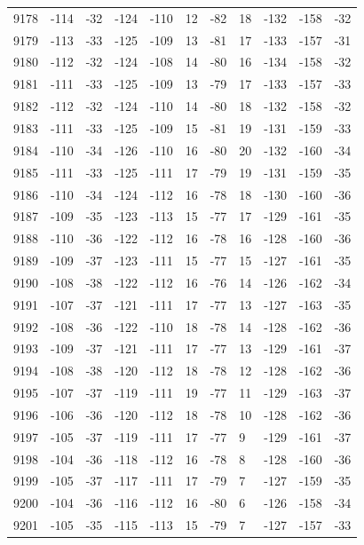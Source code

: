 \begin{table}[H]
\begin{tabular}{lllllllllll}
9178 & -114 & -32 & -124 & -110 & 12 & -82 & 18 & -132 & -158 & -32 \\
9179 & -113 & -33 & -125 & -109 & 13 & -81 & 17 & -133 & -157 & -31 \\
9180 & -112 & -32 & -124 & -108 & 14 & -80 & 16 & -134 & -158 & -32 \\
9181 & -111 & -33 & -125 & -109 & 13 & -79 & 17 & -133 & -157 & -33 \\
9182 & -112 & -32 & -124 & -110 & 14 & -80 & 18 & -132 & -158 & -32 \\
9183 & -111 & -33 & -125 & -109 & 15 & -81 & 19 & -131 & -159 & -33 \\
9184 & -110 & -34 & -126 & -110 & 16 & -80 & 20 & -132 & -160 & -34 \\
9185 & -111 & -33 & -125 & -111 & 17 & -79 & 19 & -131 & -159 & -35 \\
9186 & -110 & -34 & -124 & -112 & 16 & -78 & 18 & -130 & -160 & -36 \\
9187 & -109 & -35 & -123 & -113 & 15 & -77 & 17 & -129 & -161 & -35 \\
9188 & -110 & -36 & -122 & -112 & 16 & -78 & 16 & -128 & -160 & -36 \\
9189 & -109 & -37 & -123 & -111 & 15 & -77 & 15 & -127 & -161 & -35 \\
9190 & -108 & -38 & -122 & -112 & 16 & -76 & 14 & -126 & -162 & -34 \\
9191 & -107 & -37 & -121 & -111 & 17 & -77 & 13 & -127 & -163 & -35 \\
9192 & -108 & -36 & -122 & -110 & 18 & -78 & 14 & -128 & -162 & -36 \\
9193 & -109 & -37 & -121 & -111 & 17 & -77 & 13 & -129 & -161 & -37 \\
9194 & -108 & -38 & -120 & -112 & 18 & -78 & 12 & -128 & -162 & -36 \\
9195 & -107 & -37 & -119 & -111 & 19 & -77 & 11 & -129 & -163 & -37 \\
9196 & -106 & -36 & -120 & -112 & 18 & -78 & 10 & -128 & -162 & -36 \\
9197 & -105 & -37 & -119 & -111 & 17 & -77 & 9 & -129 & -161 & -37 \\
9198 & -104 & -36 & -118 & -112 & 16 & -78 & 8 & -128 & -160 & -36 \\
9199 & -105 & -37 & -117 & -111 & 17 & -79 & 7 & -127 & -159 & -35 \\
9200 & -104 & -36 & -116 & -112 & 16 & -80 & 6 & -126 & -158 & -34 \\
9201 & -105 & -35 & -115 & -113 & 15 & -79 & 7 & -127 & -157 & -33 \\

\end{tabular}
\end{table}
